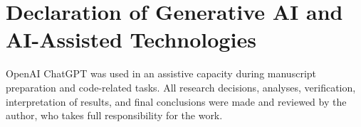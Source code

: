 \section*{Declaration of Generative AI and AI-Assisted Technologies}

OpenAI ChatGPT was used in an assistive capacity during manuscript preparation and code-related tasks. All research decisions, analyses, verification, interpretation of results, and final conclusions were made and reviewed by the author, who takes full responsibility for the work.
